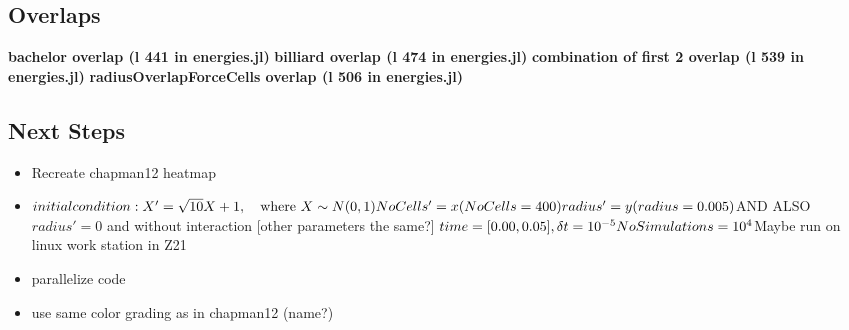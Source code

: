 \newpage
\subsection*{Overlaps}
\textbf{bachelor overlap (l 441 in energies.jl)}
\textbf{billiard overlap (l 474 in energies.jl)}
\textbf{combination of first 2 overlap  (l 539 in energies.jl)}
\textbf{radiusOverlapForceCells overlap (l 506 in energies.jl)}

\newpage
\subsection*{Next Steps}
\begin{itemize}
	\item Recreate chapman12 heatmap 
	
	\item 
	$
	initial condition: X' = \sqrt{10} X + 1, \quad \text{where } X \sim N(0,1) \\
	NoCells' = x (NoCells = 400) \\
	radius' = y (radius = 0.005) \\
	$AND ALSO$ radius' = 0 $ and without interaction [other parameters the same?] $
	time = [0.00,0.05], \delta t = 10^{-5} \\
	NoSimulations = 10^4 \\
	$Maybe run on linux work station in Z21$
	$
	\item parallelize code 
	\item use same color grading as in chapman12 (name?)

\end{itemize} 


